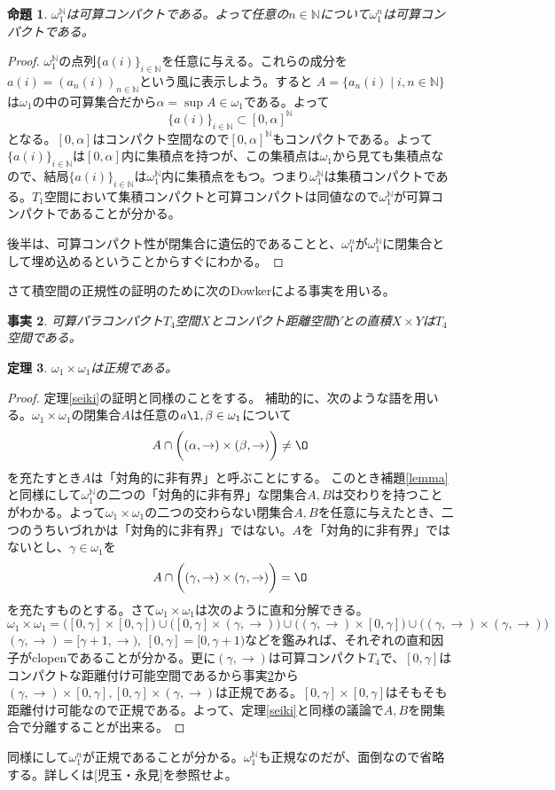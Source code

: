 \documentclass[leqno]{jsarticle}
\newtheorem{thm}{定理}
\newtheorem{prop}[thm]{命題}
\newtheorem{fact}[thm]{事実}
\newcommand{\nn}{\mathbb{N}}
\newcommand{\al}{\alpha}
\newcommand{\be}{\beta}
\newcommand{\ga}{\gamma}
\begin{document}
\begin{prop}
$\omega_1^{\nn}$は可算コンパクトである。よって任意の$n\in \nn$について$\omega_1^n$は可算コンパクトである。
\end{prop}
\begin{proof}
$\omega_1^{\nn}$の点列$\{a(i)\}_{i\in \nn}$を任意に与える。これらの成分を$a(i)=(a_n(i))_{n\in \nn}$という風に表示しよう。すると
$A=\{a_n(i)\mid i,n\in \nn\}$は$\omega_1$の中の可算集合だから$\al=\sup A\in \omega_1$である。よって
\[
\{a(i)\}_{i\in \nn}\subset [0,\al]^{\nn}
\]
となる。$[0,\al]$はコンパクト空間なので$[0,\al]^{\nn}$もコンパクトである。よって$\{a(i)\}_{i\in \nn}$は$[0,\al]$内に集積点を持つが、この集積点は$\omega_1$から見ても集積点なので、結局$\{a(i)\}_{i\in \nn}$は$\omega_1^{\nn}$内に集積点をもつ。つまり$\omega_1^{\nn}$は集積コンパクトである。$T_1$空間において集積コンパクトと可算コンパクトは同値なので$\omega_1^{\nn}$が可算コンパクトであることが分かる。\par
後半は、可算コンパクト性が閉集合に遺伝的であることと、$\omega_1^n$が$\omega_1^{\nn}$に閉集合として埋め込めるということからすぐにわかる。
\end{proof}

さて積空間の正規性の証明のために次のDowkerによる事実を用いる。


\begin{fact}\label{dk}
可算パラコンパクト$T_4$空間$X$とコンパクト距離空間$Y$との直積$X\times Y$は$T_4$空間である。
\end{fact}

\begin{thm}
$\omega_1\times \omega_1$は正規である。
\end{thm}
\begin{proof}
定理\ref{seiki}の証明と同様のことをする。
補助的に、次のような語を用いる。$\omega_1\times\omega_1$の閉集合$A$は任意の$a\l,\be\in \omega_1$について
\[
A\cap \biggl((\al,\to)\times (\be,\to)\biggr)\neq \O
\]
を充たすとき$A$は「対角的に非有界」と呼ぶことにする。
このとき補題\ref{lemma}と同様にして$\omega_1^{\nn}$の二つの「対角的に非有界」な閉集合$A,B$は交わりを持つことがわかる。よって$\omega_1\times \omega_1$の二つの交わらない閉集合$A,B$を任意に与えたとき、二つのうちいづれかは「対角的に非有界」ではない。$A$を「対角的に非有界」ではないとし、$\ga\in \omega_1$を
\[
A\cap \biggl((\ga,\to)\times (\ga,\to)\biggr)=\O
\]
を充たすものとする。さて$\omega_1\times \omega_1$は次のように直和分解できる。
\[
\omega_1\times \omega_1=\biggl([0,\ga]\times[0,\ga]\biggr)\cup \biggl([0,\ga]\times(\ga,\to)\biggr)\cup \biggl((\ga,\to)\times [0,\ga]\biggr)\cup \biggl((\ga,\to)\times (\ga,\to)\biggr)
\]
$(\ga,\to)=[\ga+1,\to),\ [0,\ga]=[0,\ga+1)$などを鑑みれば、それぞれの直和因子がclopenであることが分かる。更に$(\ga,\to)$は可算コンパクト$T_4$で、$[0,\ga]$はコンパクトな距離付け可能空間であるから事実\ref{dk}から$(\ga,\to)\times [0,\ga], [0,\ga]\times (\ga,\to)$は正規である。$[0,\ga]\times[0,\ga]$はそもそも距離付け可能なので正規である。よって、定理\ref{seiki}と同様の議論で$A,B$を開集合で分離することが出来る。
\end{proof}
同様にして$\omega_1^n$が正規であることが分かる。$\omega_1^{\nn}$も正規なのだが、面倒なので省略する。詳しくは[児玉・永見]を参照せよ。
\end{document}
